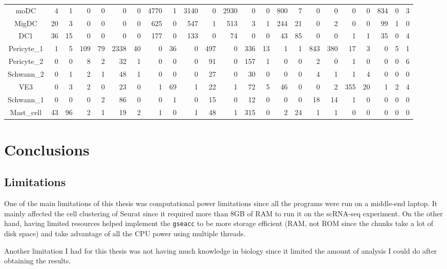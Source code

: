 \documentclass[aps,prb,twocolumn,superscriptaddress,floatfix,longbibliography]{revtex4-2}
\begin{document}
\begin{table}[htb]
\begin{adjustwidth}{-3cm}{-1cm}
\begin{tabular*}{\paperwidth-0.5cm}{| c | @{\hskip 6pt\extracolsep{\stretch{1}}}*{22}{r} |}
  moDC &   4 &   1 &   0 &   0 &   0 &   0 & 4770 &   1 & 3140 &   0 & 2930 &   0 &   0 & 800 &   7 &   0 &   0 &   0 &   0 & 834 &   0 &   3 \\
  MigDC &  20 &   3 &   0 &   0 &   0 &   0 & 625 &   0 & 547 &   1 & 513 &   3 &   1 & 244 &  21 &   0 &   2 &   0 &   0 &  99 &   1 &   0 \\
  DC1 &  36 &  15 &   0 &   0 &   0 &   0 & 177 &   0 & 133 &   0 &  74 &   0 &   0 &  43 &  85 &   0 &   0 &   1 &   1 &  35 &   0 &   4 \\
  Pericyte\_1 &   1 &   5 & 109 &  79 & 2338 &  40 &   0 &  36 &   0 & 497 &   0 & 336 &  13 &   1 &   1 & 843 & 380 &  17 &   3 &   0 &   5 &   1 \\
  Pericyte\_2 &   0 &   0 &   8 &   2 &  32 &   1 &   0 &   0 &   0 &  91 &   0 & 157 &   1 &   0 &   0 &   2 &   0 &   1 &   0 &   0 &   0 &   6 \\
  Schwann\_2 &   0 &   1 &   2 &   1 &  48 &   1 &   0 &   0 &   0 &  27 &   0 &  30 &   0 &   0 &   0 &   4 &   1 &   1 &   4 &   0 &   0 &   0 \\
  VE3 &   0 &   3 &   2 &   0 &  23 &   0 &   1 &  69 &   1 &  22 &   1 &  72 &   5 &  46 &   0 &   0 &   2 & 355 &  20 &   1 &   2 &   4 \\
  Schwann\_1 &   0 &   0 &   0 &   2 &  86 &   0 &   0 &   1 &   0 &  15 &   0 &  12 &   0 &   0 &   0 &  18 &  14 &   1 &   0 &   0 &   0 &   0 \\
  Mast\_cell &  43 &  96 &   2 &   1 &  19 &   2 &   1 &   0 &   1 &  48 &   1 & 315 &   0 &   2 &  24 &   1 &   1 &   0 &   0 &   0 &   0 &   0 \\
   \hline
    \hline
\end{tabular*}
\end{adjustwidth}
\end{table}

\section{Conclusions}

\subsection{Limitations}

One of the main limitations of this thesis was computational power limitations since all the programs were run on a middle-end laptop. It mainly affected the cell clustering of Seurat since it required more than 8GB of RAM to run it on the scRNA-seq experiment. On the other hand, having limited resources helped implement the \texttt{gseacc} to be more storage efficient (RAM, not ROM since the chunks take a lot of disk space) and take advantage of all the CPU power using multiple threads.

Another limitation I had for this thesis was not having much knowledge in biology since it limited the amount of analysis I could do after obtaining the results.


\end{document}

